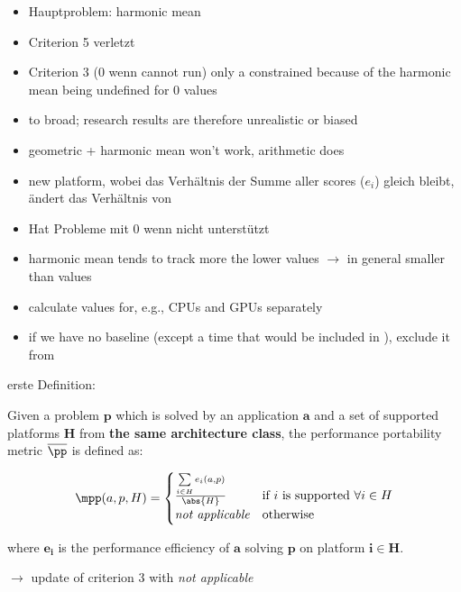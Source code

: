\newpage
\cite{marowka_toward_2021}

\begin{itemize}
    \item Hauptproblem: harmonic mean
    \item Criterion 5 verletzt
    \item Criterion 3 (0 wenn cannot run) only a constrained because of the harmonic mean being undefined for $0$ values
    \item \pp to broad; research results are therefore unrealistic or biased
    \item geometric + harmonic mean won't work, arithmetic does 
    \item new platform, wobei das Verhältnis der Summe aller scores ($e_i$) gleich bleibt, ändert das Verhältnis von \pp
    \item Hat Probleme mit $0$ wenn nicht unterstützt
    \item harmonic mean tends to track more the lower values $\rightarrow$ in general smaller \pp than \mpp values
    \item calculate values for, e.g., CPUs and GPUs separately
    \item if we have no baseline (except a time that would be included in \pp), exclude it from \mpp
\end{itemize}

erste Definition:
\begin{definition}\label{def:mpp}
    Given a problem $\mathbf{p}$ which is solved by an application $\mathbf{a}$ and a set of supported platforms $\mathbf{H}$ from \textbf{the same architecture class}, the performance portability metric $\overline{\pp}$ is defined as:

    \[ \mpp(a, p, H) = 
        \begin{cases}
            \frac{\sum\limits_{i \in H} e_i(a, p)}{\abs{H}} & \text{if }i\text{ is supported }\forall i \in H \\
            \textit{not applicable}                         & \text{otherwise}
        \end{cases} 
    \]

    where $\mathbf{e_i}$ is the performance efficiency of $\mathbf{a}$ solving $\mathbf{p}$ on platform $\mathbf{i \in H}$.
\end{definition}
$\rightarrow$ update of criterion 3 with \textit{not applicable}














